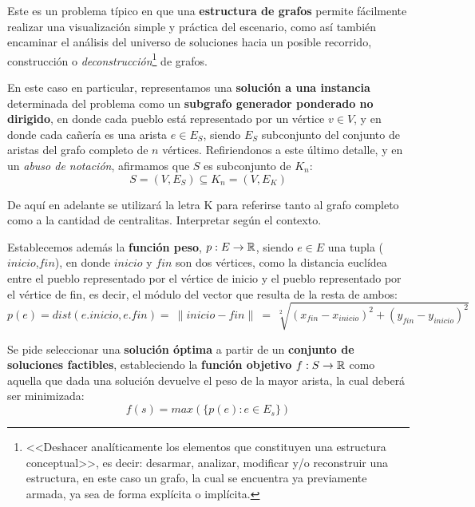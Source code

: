 \documentclass[11pt, a4paper, twoside]{article}
\begin{document}
{}


Este es un problema típico en que una \textbf{estructura de grafos} permite
fácilmente realizar una visualización simple y práctica del escenario, como
así también encaminar el análisis del universo de soluciones hacia un posible
recorrido, construcción o \emph{deconstrucción}\footnote{<<Deshacer
analíticamente los elementos que constituyen una estructura conceptual>>, es
decir: desarmar, analizar, modificar y/o reconstruir una estructura, en este
caso un grafo, la cual se encuentra ya previamente armada, ya sea de forma
explícita o implícita.} de grafos.

En este caso en particular, representamos una \textbf{solución a una instancia} determinada del
problema como un \textbf{subgrafo generador ponderado no dirigido}, en donde cada pueblo está
representado por un vértice $v \in V$, y en donde cada cañería es una arista $e \in E_{S}$, siendo
$E_{S}$ subconjunto del conjunto de aristas del grafo completo de $n$ vértices. Refiriendonos a este
último detalle, y en un \emph{abuso de notación}, afirmamos que $S$ es subconjunto de $K_{n}$:
%
    \[
    S = (V,E_{S}) \subseteq K_{n} = (V,E_{K})
    \]
%

\begin{aclaracion}

De aquí en adelante se utilizará la letra K para referirse tanto al grafo
completo como a la cantidad de centralitas. Interpretar según el contexto.

\end{aclaracion}


Establecemos además la \textbf{función peso}, $p: E \rightarrow \mathbb{R}$, siendo $e \in E$ una tupla
($inicio$,$fin$), en donde $inicio$ y $fin$ son dos vértices, como la distancia euclídea entre el
pueblo representado por el vértice de inicio y el pueblo representado por el vértice de fin, es
decir, el módulo del vector que resulta de la resta de ambos:
%
\[
  p(e) = dist(e.inicio, e.fin) =~\parallel inicio - fin \parallel ~=~ \sqrt[2]{(x_{fin}-x_{inicio})^{2}+(y_{fin}-y_{inicio})^{2}}
\]

\begin{paragraph}{}

\label{ej2-funcionobjetivo}

Se pide seleccionar una \textbf{solución óptima} a partir de un \textbf{conjunto de soluciones
factibles}, estableciendo la \textbf{función objetivo} $f: S \rightarrow \mathbb{R}$ como aquella que
dada una solución devuelve el peso de la mayor arista, la cual deberá ser minimizada:
%
\[
f(s) = max(\{p(e) : e \in E_{s}\})
\]

\end{paragraph}
\end{document}
